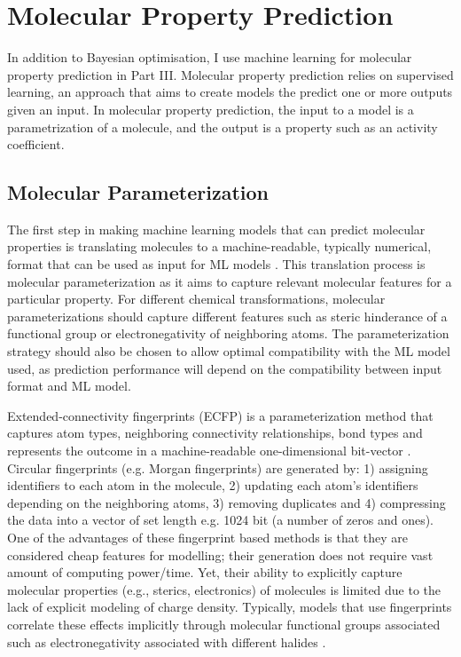 \section{Molecular Property Prediction}

In addition to Bayesian optimisation, I use machine learning for molecular property prediction in Part III. Molecular property prediction relies on supervised learning, an approach that aims to create models the predict one or more outputs given an input. In molecular property prediction, the input to a model is a parametrization of a molecule, and the output is a property such as an activity coefficient.

\subsection{Molecular Parameterization}

The first step in making machine learning models that can predict molecular properties is translating molecules to a machine-readable, typically numerical, format that can be used as input for ML models \cite{Wigh2022}. This translation process is molecular parameterization as it aims to capture relevant molecular features for a particular property. For different chemical transformations, molecular parameterizations should capture different features such as steric hinderance of a functional group or electronegativity of neighboring atoms. The parameterization strategy should also be chosen to allow optimal compatibility with the ML model used, as prediction performance will depend on the compatibility between input format and ML model.

Extended-connectivity fingerprints (ECFP) is a parameterization method that captures atom types, neighboring connectivity relationships, bond types and represents the outcome in a machine-readable one-dimensional bit-vector \cite{Rogers2010}. Circular fingerprints (e.g. Morgan fingerprints) are generated by: 1) assigning identifiers to each atom in the molecule, 2) updating each atom’s identifiers depending on the neighboring atoms, 3) removing duplicates and 4) compressing the data into a vector of set length e.g. 1024 bit (a number of zeros and ones). One of the advantages of these fingerprint based methods is that they are considered cheap features for modelling; their generation does not require vast amount of computing power/time. Yet, their ability to explicitly capture molecular properties (e.g., sterics, electronics) of molecules is limited due to the lack of explicit modeling of charge density. Typically, models that use fingerprints correlate these effects implicitly through molecular functional groups associated such as electronegativity associated with different halides \cite{Eyke2020}.

